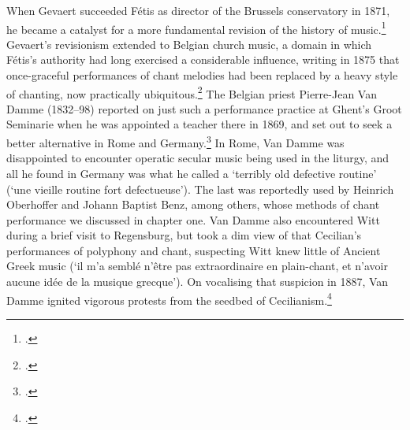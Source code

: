 When Gevaert succeeded Fétis as director of the Brussels conservatory in 1871, he became a catalyst for a more fundamental revision of the history of music.\footcite[375]{PouginBiographieuniversellemusiciens1881}
Gevaert's revisionism extended to Belgian church music, a domain in which Fétis's authority had long exercised a considerable influence, writing in 1875 that once-graceful performances of chant melodies had been replaced by a heavy style of chanting, now practically ubiquitous.\footcite[390--92]{GevaertHistoiretheoriemusique1875}
The Belgian priest Pierre-Jean Van Damme (1832--98) reported on just such a performance practice at Ghent's Groot Seminarie when he was appointed a teacher there in 1869, and set out  to seek a better alternative in Rome and Germany.\footcite[14--15]{RobijnsJaakNikolaasLemmens1981}
In Rome, Van Damme was disappointed to encounter operatic secular music being used in the liturgy, and all he found in Germany was what he called a `terribly old defective routine' (`une vieille routine fort defectueuse').
The last was reportedly used by Heinrich Oberhoffer and Johann Baptist Benz, among others, whose methods of chant performance we discussed in chapter one.
Van Damme also encountered Witt during a brief visit to Regensburg, but took a dim view of that Cecilian's performances of polyphony and chant, suspecting Witt knew little of Ancient Greek music (`il m'a semblé n'être pas extraordinaire en plain-chant, et n'avoir aucune idée de la musique grecque').
On vocalising that suspicion in 1887, Van Damme ignited vigorous protests from the seedbed of Cecilianism.\footcite[53--4]{VanDammeromanhistorique1887}

